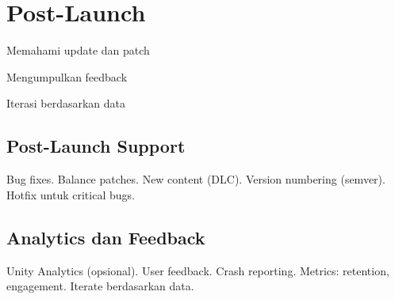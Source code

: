 \section{Post-Launch}

\begin{learningoutcomes}
\item Memahami update dan patch
\item Mengumpulkan feedback
\item Iterasi berdasarkan data
\end{learningoutcomes}

\subsection{Post-Launch Support}

Bug fixes. Balance patches. New content (DLC). Version numbering (semver). Hotfix untuk critical bugs.

\subsection{Analytics dan Feedback}

Unity Analytics (opsional). User feedback. Crash reporting. Metrics: retention, engagement. Iterate berdasarkan data.
